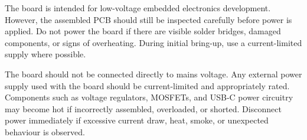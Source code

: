 The board is intended for low-voltage embedded electronics development. 
However, the assembled PCB should still be inspected carefully before power is applied. 
Do not power the board if there are visible solder bridges, damaged components, 
or signs of overheating. During initial bring-up, use a current-limited supply where possible.

The board should not be connected directly to mains voltage. 
Any external power supply used with the board should be current-limited and appropriately rated. 
Components such as voltage regulators, MOSFETs, 
and USB-C power circuitry may become hot if incorrectly assembled, overloaded, or shorted. 
Disconnect power immediately if excessive current draw, heat, smoke, 
or unexpected behaviour is observed.
